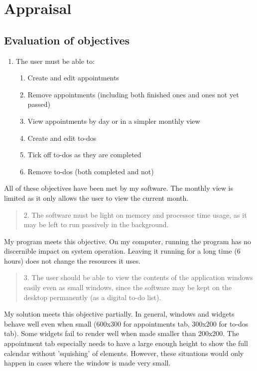 \section{Appraisal}
\subsection{Evaluation of objectives}

\begin{enumerate}
    \item The user must be able to:
    \begin{enumerate}
        \item Create and edit appointments
        \item Remove appointments (including both finished ones and ones not yet
            passed)
        \item View appointments by day or in a simpler monthly view
        \item Create and edit to-dos
        \item Tick off to-dos as they are completed
        \item Remove to-dos (both completed and not)
    \end{enumerate}
\end{enumerate}

All of these objectives have been met by my software. The monthly view is
limited as it only allows the user to view the current month.

\begin{quotation}
2. The software must be light on memory and processor time usage, as it may be
left to run passively in the background.
\end{quotation}

My program meets this objective. On my computer, running the program has no
discernible impact on system operation. Leaving it running for a long time (6
hours) does not change the resources it uses.

\begin{quotation}
3. The user should be able to view the contents of the application windows
easily even as small windows, since the software may be kept on the desktop
permanently (as a digital to-do list).
\end{quotation}

My solution meets this objective partially. In general, windows and widgets
behave well even when small (600x300 for appointments tab, 300x200 for to-dos
tab). Some widgets fail to render well when made smaller than 200x200. The
appointment tab especially needs to have a large enough height to show the full
calendar without 'squishing' of elements.  However, these situations would only
happen in cases where the window is made very small.

